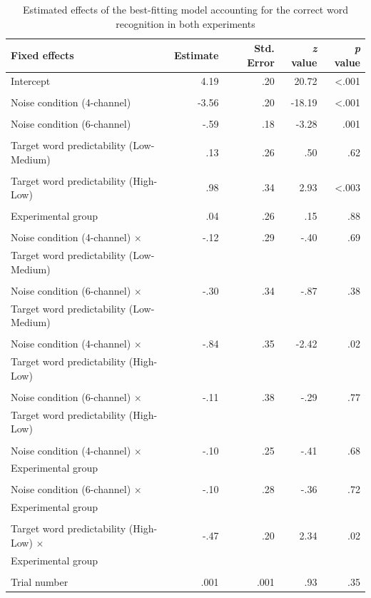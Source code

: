 \documentclass[a4paper, nobind]{templates/ociamthesis}
\begin{document}
\begin{table}[h!]
\begin{center}
\caption{Estimated effects of the best-fitting model accounting for the correct word recognition in both experiments}
\label{results1ab} 
\vskip 0.12in
\begin{tabular}[]{@{}lrrrr@{}}
\toprule
Fixed effects & Estimate & Std. Error & \emph{z} value & \emph{p}
value \\
\midrule
Intercept & 4.19 & .20 & 20.72 & \textless.001 \\
\\
Noise condition (4-channel) & -3.56 & .20 & -18.19 & \textless.001 \\
\\
Noise condition (6-channel) & -.59 & .18 & -3.28 & .001 \\
\\
Target word predictability (Low-Medium) & .13 & .26 & .50 & .62 \\
\\
Target word predictability (High-Low) & .98 & .34 & 2.93 & \textless.003 \\
\\
Experimental group & .04 & .26 & .15 & .88 \\
\\
Noise condition (4-channel) $\times$ & -.12 & .29 & -.40 & .69 \\
Target word predictability (Low-Medium) \\
\\
Noise condition (6-channel) $\times$ & -.30 & .34 & -.87 & .38 \\
Target word predictability (Low-Medium) \\
\\
Noise condition (4-channel) $\times$ & -.84 & .35 & -2.42 & .02 \\
Target word predictability (High-Low) \\
\\
Noise condition (6-channel) $\times$ & -.11 & .38 & -.29 & .77 \\
Target word predictability (High-Low) \\
\\
Noise condition (4-channel) $\times$ & -.10 & .25 & -.41 & .68 \\
Experimental group \\
\\
Noise condition (6-channel) $\times$ & -.10 & .28 & -.36 & .72 \\
Experimental group \\
\\
Target word predictability (High-Low) $\times$ & -.47 & .20 & 2.34 & .02 \\
Experimental group \\
\\
Trial number & .001 & .001 & .93 & .35 \\
\bottomrule
\end{tabular} 
\end{center} 
\end{table}
\end{document}
